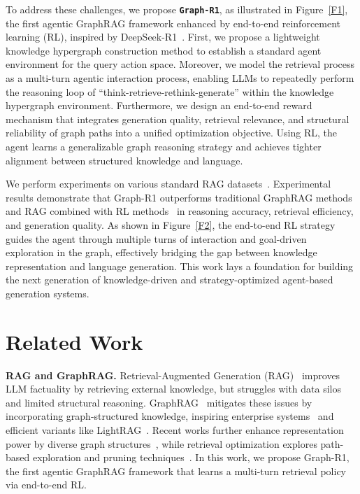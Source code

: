 \documentclass{article}
\theoremstyle{plain}
\theoremstyle{definition}
\theoremstyle{remark}
\begin{document}
To address these challenges, we propose \texttt{\textbf{Graph-R1}}, as illustrated in Figure~\ref{F1}, the first agentic GraphRAG framework enhanced by end-to-end reinforcement learning (RL), inspired by DeepSeek-R1~\citep{DeepSeek-R1}. First, we propose a lightweight knowledge hypergraph construction method to establish a standard agent environment for the query action space. Moreover, we model the retrieval process as a multi-turn agentic interaction process, enabling LLMs to repeatedly perform the reasoning loop of “think-retrieve-rethink-generate” within the knowledge hypergraph environment. Furthermore, we design an end-to-end reward mechanism that integrates generation quality, retrieval relevance, and structural reliability of graph paths into a unified optimization objective. Using RL, the agent learns a generalizable graph reasoning strategy and achieves tighter alignment between structured knowledge and language.

We perform experiments on various standard RAG datasets~\citep{FlashRAG}. Experimental results demonstrate that Graph-R1 outperforms traditional GraphRAG methods and RAG combined with RL methods~\citep{Search-R1,R1-Searcher} in reasoning accuracy, retrieval efficiency, and generation quality. As shown in Figure~\ref{F2}, the end-to-end RL strategy guides the agent through multiple turns of interaction and goal-driven exploration in the graph, effectively bridging the gap between knowledge representation and language generation. This work lays a foundation for building the next generation of knowledge-driven and strategy-optimized agent-based generation systems.

\section{Related Work}

\textbf{RAG and GraphRAG. }
Retrieval-Augmented Generation (RAG)~\citep{RAG} improves LLM factuality by retrieving external knowledge, but struggles with data silos and limited structural reasoning. GraphRAG~\citep{GraphRAG} mitigates these issues by incorporating graph-structured knowledge, inspiring enterprise systems~\citep{MedGraphRAG,KAG,PIKE-RAG} and efficient variants like LightRAG~\citep{LightRAG}. Recent works further enhance representation power by diverse graph structures~\citep{HyperGraphRAG,Hyper-RAG,HyperRec,CausalRAG,NodeRAG,LinearRAG}, while retrieval optimization explores path-based exploration and pruning techniques~\citep{PathRAG,HippoRAG2,HopRAG,PropRAG,E2GraphRAG,GFM-RAG,G-reasoner,HybGRAG,Youtu-GraphRAG,GraphSearch}. In this work, we propose Graph-R1, the first agentic GraphRAG framework that learns a multi-turn retrieval policy via end-to-end RL.
\end{document}

